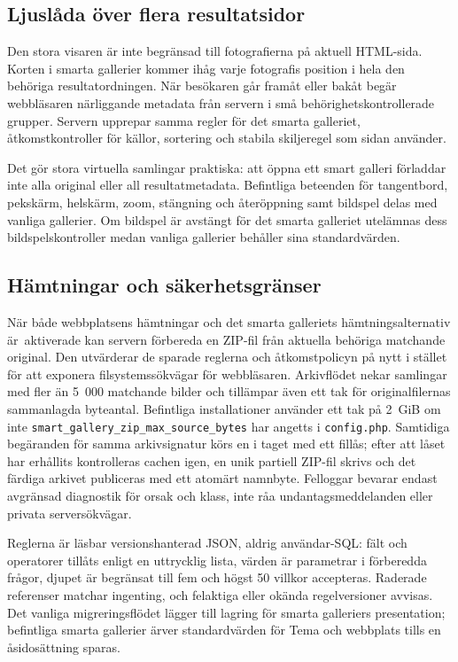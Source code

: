 \documentclass[11pt,a4paper]{article}
\begin{document}
\subsection{Ljuslåda över flera resultatsidor}

Den stora visaren är inte begränsad till fotografierna på aktuell HTML-sida.
Korten i smarta gallerier kommer ihåg varje fotografis position i hela den
behöriga resultatordningen. När besökaren går framåt eller bakåt begär
webbläsaren närliggande metadata från servern i små behörighetskontrollerade
grupper. Servern upprepar samma regler för det smarta galleriet,
åtkomstkontroller för källor, sortering och stabila skiljeregel som sidan
använder.

Det gör stora virtuella samlingar praktiska: att öppna ett smart galleri
förladdar inte alla original eller all resultatmetadata. Befintliga beteenden
för tangentbord, pekskärm, helskärm, zoom, stängning och återöppning samt
bildspel delas med vanliga gallerier. Om bildspel är avstängt för det smarta
galleriet utelämnas dess bildspelskontroller medan vanliga gallerier behåller
sina standardvärden.

\subsection{Hämtningar och säkerhetsgränser}

När både webbplatsens hämtningar och det smarta galleriets hämtningsalternativ
är~aktiverade kan servern förbereda en ZIP-fil från aktuella behöriga matchande
original. Den utvärderar de sparade reglerna och åtkomstpolicyn på nytt i
stället för att exponera filsystemssökvägar för webbläsaren. Arkivflödet nekar
samlingar med fler än 5~000 matchande bilder och tillämpar även ett tak för
originalfilernas sammanlagda byteantal. Befintliga installationer använder ett
tak på 2~GiB om inte \texttt{smart\_gallery\_zip\_max\_source\_bytes} har
angetts i \texttt{config.php}. Samtidiga begäranden för samma arkivsignatur körs
en i taget med ett fillås; efter att låset har erhållits kontrolleras cachen
igen, en unik partiell ZIP-fil skrivs och det färdiga arkivet publiceras med ett
atomärt namnbyte. Felloggar bevarar endast avgränsad diagnostik för orsak och
klass, inte råa undantagsmeddelanden eller privata serversökvägar.

Reglerna är läsbar versionshanterad JSON, aldrig användar-SQL: fält och
operatorer tillåts enligt en uttrycklig lista, värden är parametrar i förberedda
frågor, djupet är begränsat till fem och högst 50 villkor accepteras. Raderade
referenser matchar ingenting, och felaktiga eller okända regelversioner avvisas.
Det vanliga migreringsflödet lägger till lagring för smarta galleriers
presentation; befintliga smarta gallerier ärver standardvärden för Tema och
webbplats tills en åsidosättning sparas.
\end{document}
